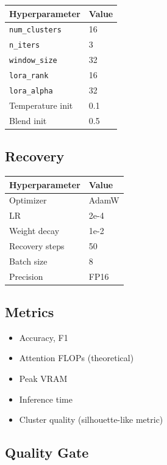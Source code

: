 \begin{table}[H]
\centering
\small
\begin{tabular}{ll}
\toprule
\textbf{Hyperparameter} & \textbf{Value} \\
\midrule
\texttt{num\_clusters} & 16 \\
\texttt{n\_iters} & 3 \\
\texttt{window\_size} & 32 \\
\texttt{lora\_rank} & 16 \\
\texttt{lora\_alpha} & 32 \\
Temperature init & 0.1 \\
Blend init & 0.5 \\
\bottomrule
\end{tabular}
\end{table}

\subsection{Recovery}

\begin{table}[H]
\centering
\small
\begin{tabular}{ll}
\toprule
\textbf{Hyperparameter} & \textbf{Value} \\
\midrule
Optimizer & AdamW \\
LR & 2e-4 \\
Weight decay & 1e-2 \\
Recovery steps & 50 \\
Batch size & 8 \\
Precision & FP16 \\
\bottomrule
\end{tabular}
\end{table}

\subsection{Metrics}

\begin{itemize}
\item Accuracy, F1
\item Attention FLOPs (theoretical)
\item Peak VRAM
\item Inference time
\item Cluster quality (silhouette-like metric)

\end{itemize}
\subsection{Quality Gate}

